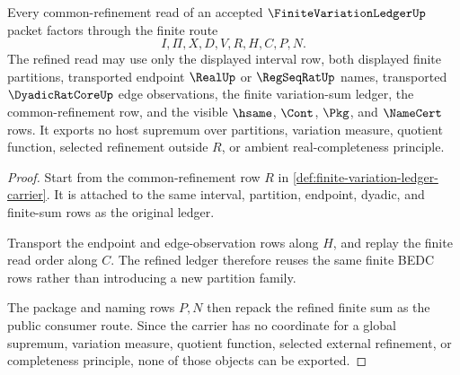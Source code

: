 \begin{theorem}
\label{thm:finite-variation-ledger-common-refinement-route}
Every common-refinement read of an accepted $\FiniteVariationLedgerUp$ packet factors through the finite route
$$
I,\Pi,X,D,V,R,H,C,P,N .
$$
The refined read may use only the displayed interval row, both displayed finite partitions, transported endpoint $\RealUp$ or $\RegSeqRatUp$ names, transported $\DyadicRatCoreUp$ edge observations, the finite variation-sum ledger, the common-refinement row, and the visible $\hsame$, $\Cont$, $\Pkg$, and $\NameCert$ rows. It exports no host supremum over partitions, variation measure, quotient function, selected refinement outside $R$, or ambient real-completeness principle.
\end{theorem}
\begin{proof}
Start from the common-refinement row $R$ in \autoref{def:finite-variation-ledger-carrier}. It is attached to the same interval, partition, endpoint, dyadic, and finite-sum rows as the original ledger.

Transport the endpoint and edge-observation rows along $H$, and replay the finite read order along $C$. The refined ledger therefore reuses the same finite BEDC rows rather than introducing a new partition family.

The package and naming rows $P,N$ then repack the refined finite sum as the public consumer route. Since the carrier has no coordinate for a global supremum, variation measure, quotient function, selected external refinement, or completeness principle, none of those objects can be exported.
\end{proof}


\begin{closurestatus}{\FiniteVariationLedgerUp}
  \theoryclosure{\seedClosure}
  \formalstatus{\unformalizedV}
\end{closurestatus}
